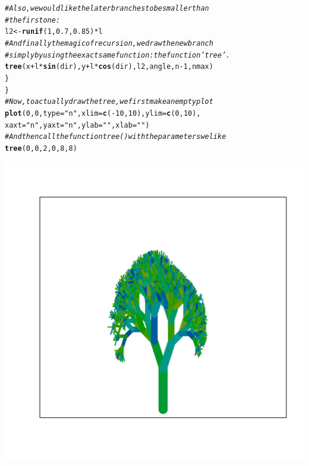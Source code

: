 \documentclass[12pt,a4paper]{scrartcl}\usepackage[]{graphicx}\usepackage[]{color}
\makeatletter
\def\maxwidth{ %
  \ifdim\Gin@nat@width>\linewidth
    \linewidth
  \else
    \Gin@nat@width
  \fi
}
\newcommand{\hlnum}[1]{\textcolor[rgb]{0.686,0.059,0.569}{#1}}%
\newcommand{\hlstr}[1]{\textcolor[rgb]{0.192,0.494,0.8}{#1}}%
\newcommand{\hlcom}[1]{\textcolor[rgb]{0.678,0.584,0.686}{\textit{#1}}}%
\newcommand{\hlopt}[1]{\textcolor[rgb]{0,0,0}{#1}}%
\newcommand{\hlstd}[1]{\textcolor[rgb]{0.345,0.345,0.345}{#1}}%
\newcommand{\hlkwb}[1]{\textcolor[rgb]{0.69,0.353,0.396}{#1}}%
\newcommand{\hlkwc}[1]{\textcolor[rgb]{0.333,0.667,0.333}{#1}}%
\newcommand{\hlkwd}[1]{\textcolor[rgb]{0.737,0.353,0.396}{\textbf{#1}}}%
\newenvironment{kframe}{%
 \def\at@end@of@kframe{}%
 \ifinner\ifhmode%
  \def\at@end@of@kframe{\end{minipage}}%
  \begin{minipage}{\columnwidth}%
 \fi\fi%
 \def\FrameCommand##1{\hskip\@totalleftmargin \hskip-\fboxsep
 \colorbox{shadecolor}{##1}\hskip-\fboxsep
     \hskip-\linewidth \hskip-\@totalleftmargin \hskip\columnwidth}%
 \MakeFramed {\advance\hsize-\width
   \@totalleftmargin\z@ \linewidth\hsize
   \@setminipage}}%
 {\par\unskip\endMakeFramed%
 \at@end@of@kframe}
\newenvironment{knitrout}{}{} %
\makeatother
\begin{document}
\begin{Answer}
\begin{knitrout}
\begin{kframe}
\begin{alltt}
\hlcom{# Also, we would like the later branches to be smaller than}
\hlcom{# the first one:}
\hlstd{l2}\hlkwb{<-}\hlkwd{runif}\hlstd{(}\hlnum{1}\hlstd{,}\hlnum{0.7}\hlstd{,}\hlnum{0.85}\hlstd{)}\hlopt{*}\hlstd{l}
\hlcom{# And finally the magic of recursion, we draw the new branch}
\hlcom{# simply by using theexact same function: the function 'tree'.}
\hlkwd{tree}\hlstd{(x}\hlopt{+}\hlstd{l}\hlopt{*}\hlkwd{sin}\hlstd{(dir),y}\hlopt{+}\hlstd{l}\hlopt{*}\hlkwd{cos}\hlstd{(dir),l2,angle,n}\hlopt{-}\hlnum{1}\hlstd{,nmax)}
\hlstd{\}}
\hlstd{\}}
\hlcom{# Now, to actually draw the tree, we first make an empty plot}
\hlkwd{plot}\hlstd{(}\hlnum{0}\hlstd{,}\hlnum{0}\hlstd{,}\hlkwc{type}\hlstd{=}\hlstr{"n"}\hlstd{,}\hlkwc{xlim}\hlstd{=}\hlkwd{c}\hlstd{(}\hlopt{-}\hlnum{10}\hlstd{,}\hlnum{10}\hlstd{),}\hlkwc{ylim}\hlstd{=}\hlkwd{c}\hlstd{(}\hlnum{0}\hlstd{,}\hlnum{10}\hlstd{),}
\hlkwc{xaxt}\hlstd{=}\hlstr{"n"}\hlstd{,}\hlkwc{yaxt}\hlstd{=}\hlstr{"n"}\hlstd{,}\hlkwc{ylab}\hlstd{=}\hlstr{""}\hlstd{,}\hlkwc{xlab}\hlstd{=}\hlstr{""}\hlstd{)}
\hlcom{# And then call the function tree() with the parameters we like}
\hlkwd{tree}\hlstd{(}\hlnum{0}\hlstd{,}\hlnum{0}\hlstd{,}\hlnum{2}\hlstd{,}\hlnum{0}\hlstd{,}\hlnum{8}\hlstd{,}\hlnum{8}\hlstd{)}
\end{alltt}
\end{kframe}
\includegraphics[width=\maxwidth]{figure/unnamed-chunk-13-1} 

\end{knitrout}
\end{Answer}
\end{document}
